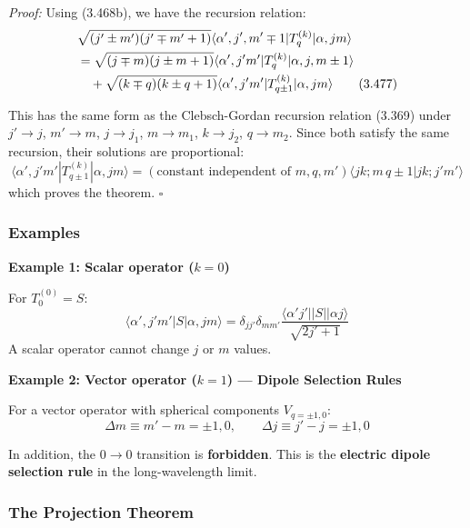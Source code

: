 \documentclass[11pt,a4paper]{article}
\begin{document}
\textit{Proof:} Using (3.468b), we have the recursion relation:
\begin{align}
&\sqrt{(j' \pm m')(j' \mp m' + 1)}\langle\alpha', j', m' \mp 1|T_q^{(k)}|\alpha, jm\rangle \notag \\
&= \sqrt{(j \mp m)(j \pm m + 1)}\langle\alpha', j'm'|T_q^{(k)}|\alpha, j, m \pm 1\rangle \notag \\
&\quad + \sqrt{(k \mp q)(k \pm q + 1)}\langle\alpha', j'm'|T_{q\pm 1}^{(k)}|\alpha, jm\rangle
\tag{3.477}
\end{align}

This has the same form as the Clebsch-Gordan recursion relation (3.369) under $j' \to j$, $m' \to m$, $j \to j_1$, $m \to m_1$, $k \to j_2$, $q \to m_2$. Since both satisfy the same recursion, their solutions are proportional:
\begin{equation}
\langle\alpha', j'm'|T_{q\pm 1}^{(k)}|\alpha, jm\rangle = (\text{constant independent of } m, q, m')\langle jk; m\, q\pm 1|jk; j'm'\rangle
\tag{3.480}
\end{equation}
which proves the theorem. $\square$

\subsubsection{Examples}

\textbf{Example 1: Scalar operator ($k = 0$)}

For $T_0^{(0)} = S$:
\begin{equation}
\langle\alpha', j'm'|S|\alpha, jm\rangle = \delta_{jj'}\delta_{mm'}\frac{\langle\alpha' j'||S||\alpha j\rangle}{\sqrt{2j'+1}}
\tag{3.481}
\end{equation}
A scalar operator cannot change $j$ or $m$ values.

\textbf{Example 2: Vector operator ($k = 1$) --- Dipole Selection Rules}

For a vector operator with spherical components $V_{q=\pm 1, 0}$:
\begin{equation}
\boxed{\Delta m \equiv m' - m = \pm 1, 0, \qquad \Delta j \equiv j' - j = \pm 1, 0}
\tag{3.482}
\end{equation}

In addition, the $0 \to 0$ transition is \textbf{forbidden}. This is the \textbf{electric dipole selection rule} in the long-wavelength limit.

\subsubsection{The Projection Theorem}
\end{document}
